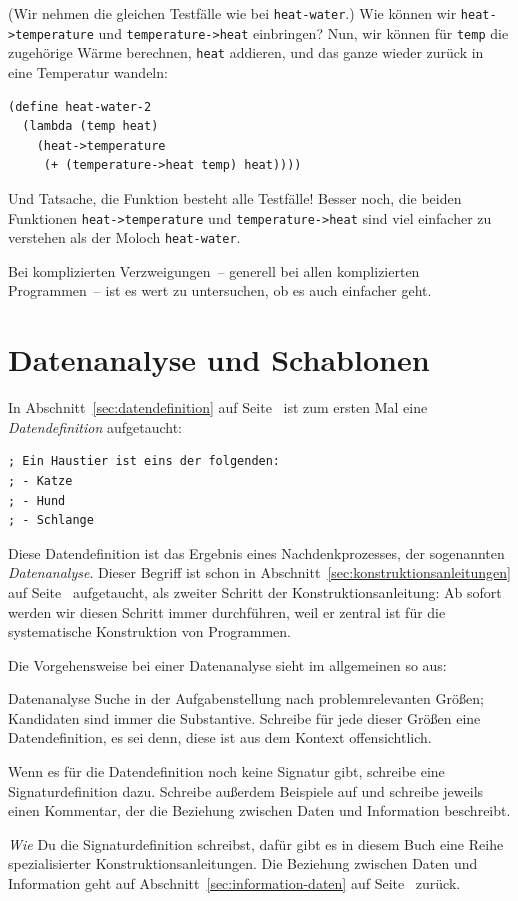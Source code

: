 %
(Wir nehmen die gleichen Testfälle wie bei \lstinline{heat-water}.)
Wie können wir \lstinline{heat->temperature} und
\lstinline{temperature->heat} einbringen?  Nun, wir können für
\lstinline{temp} die zugehörige Wärme berechnen, \lstinline{heat}
addieren, und das ganze wieder zurück in eine Temperatur wandeln:
%
\begin{lstlisting}
(define heat-water-2
  (lambda (temp heat)
    (heat->temperature
     (+ (temperature->heat temp) heat))))
\end{lstlisting}
%
Und Tatsache, die Funktion besteht alle Testfälle!  Besser noch, die
beiden Funktionen \lstinline{heat->temperature} und
\lstinline{temperature->heat} sind viel einfacher zu verstehen als der
Moloch \lstinline{heat-water}.

Bei komplizierten Verzweigungen~-- generell bei allen komplizierten
Programmen~-- ist es wert zu untersuchen, ob es auch einfacher geht.

\section{Datenanalyse und Schablonen}
\label{sec:datenanalyse}

In Abschnitt~\ref{sec:datendefinition} auf
Seite~\pageref{sec:datendefinition} ist zum ersten Mal eine
\textit{Datendefinition} aufgetaucht:
%
\begin{lstlisting}
; Ein Haustier ist eins der folgenden:
; - Katze
; - Hund
; - Schlange
\end{lstlisting}
%
Diese Datendefinition ist das Ergebnis eines Nachdenkprozesses, der
sogenannten \textit{Datenanalyse}.  Dieser Begriff
ist schon in Abschnitt~\ref{sec:konstruktionsanleitungen} auf
Seite~\pageref{sec:konstruktionsanleitungen} aufgetaucht, als zweiter
Schritt der Konstruktionsanleitung: Ab sofort werden wir diesen
Schritt immer durchführen, weil er zentral ist für die systematische
Konstruktion von Programmen.

Die Vorgehensweise bei einer Datenanalyse sieht im allgemeinen so aus:
%
\begin{konstruktionsanleitung}{Datenanalyse}
  Suche in der Aufgabenstellung nach problemrelevanten Größen;
  Kandidaten sind immer die Substantive. Schreibe für jede dieser
  Größen eine Datendefinition, es sei denn, diese ist aus dem Kontext
  offensichtlich.

  Wenn es für die Datendefinition noch keine Signatur gibt, schreibe
  eine Signaturdefinition dazu.  Schreibe außerdem Beispiele auf und
  schreibe jeweils einen Kommentar, der die Beziehung zwischen Daten
  und Information beschreibt.
\end{konstruktionsanleitung}
%
\emph{Wie} Du die Signaturdefinition schreibst, dafür gibt es in
diesem Buch eine Reihe spezialisierter Konstruktionsanleitungen.  Die
Beziehung zwischen Daten und Information geht auf
Abschnitt~\ref{sec:information-daten} auf
Seite~\pageref{sec:information-daten} zurück.

